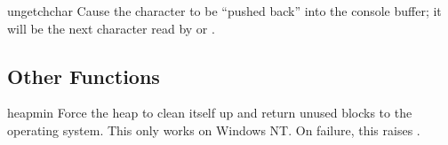 \begin{funcdesc}{ungetch}{char}
  Cause the character  to be ``pushed back'' into the
  console buffer; it will be the next character read by
   or .
\end{funcdesc}


\subsection{Other Functions \label{msvcrt-other}}

\begin{funcdesc}{heapmin}{}
  Force the  heap to clean itself up and return
  unused blocks to the operating system.  This only works on Windows
  NT.  On failure, this raises .
\end{funcdesc}
